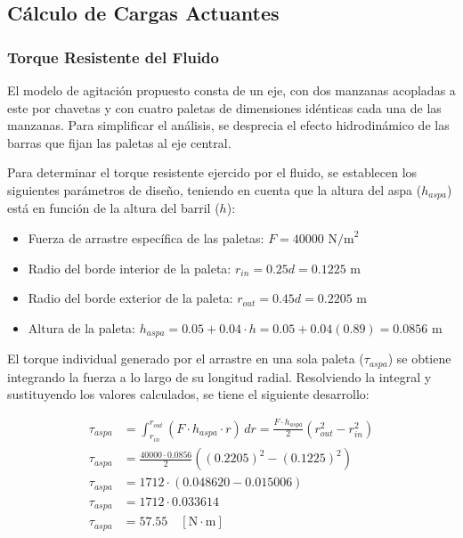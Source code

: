 \documentclass[12pt, a4paper]{article}
\begin{document}
\subsection{Cálculo de Cargas Actuantes}
\subsubsection{Torque Resistente del Fluido}
El modelo de agitación propuesto consta de un eje, con dos manzanas acopladas a este por chavetas y con cuatro paletas de dimensiones idénticas cada una de las manzanas. Para simplificar el análisis, se desprecia el efecto hidrodinámico de las barras que fijan las paletas al eje central.

Para determinar el torque resistente ejercido por el fluido, se establecen los siguientes parámetros de diseño, teniendo en cuenta que la altura del aspa ($h_{aspa}$) está en función de la altura del barril ($h$):
\begin{itemize}
    \item Fuerza de arrastre específica de las paletas: $F = 40000 \text{ N/m}^2$
    \item Radio del borde interior de la paleta: $r_{in} = 0.25d = 0.1225 \text{ m}$
    \item Radio del borde exterior de la paleta: $r_{out} = 0.45d = 0.2205 \text{ m}$
    \item Altura de la paleta: $h_{aspa} = 0.05 + 0.04 \cdot h = 0.05 + 0.04(0.89) = 0.0856 \text{ m}$
\end{itemize}

El torque individual generado por el arrastre en una sola paleta ($\tau_{aspa}$) se obtiene integrando la fuerza a lo largo de su longitud radial. Resolviendo la integral y sustituyendo los valores calculados, se tiene el siguiente desarrollo:

\begin{align}
    \tau_{aspa} &= \int_{r_{in}}^{r_{out}} (F \cdot h_{aspa} \cdot r) \, dr = \frac{F \cdot h_{aspa}}{2} \left( r_{out}^2 - r_{in}^2 \right) \\[6pt]
    \tau_{aspa} &= \frac{40000 \cdot 0.0856}{2} \left( (0.2205)^2 - (0.1225)^2 \right) \\[6pt]
    \tau_{aspa} &= 1712 \cdot (0.048620 - 0.015006) \\[6pt]
    \tau_{aspa} &= 1712 \cdot 0.033614 \\[6pt]
    \tau_{aspa} &= 57.55 \quad [\text{N}\cdot\text{m}]
\end{align}
\end{document}
